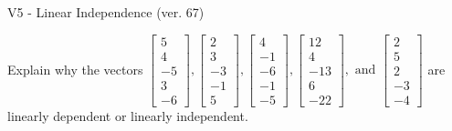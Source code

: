 \begin{exercise}
  \begin{exerciseTitle}V5 - Linear Independence (ver. 67)\end{exerciseTitle}
  \begin{exerciseStatement}
    Explain why the vectors \(\left[\begin{array}{r}
5 \\
4 \\
-5 \\
3 \\
-6
\end{array}\right] , \left[\begin{array}{r}
2 \\
3 \\
-3 \\
-1 \\
5
\end{array}\right] , \left[\begin{array}{r}
4 \\
-1 \\
-6 \\
-1 \\
-5
\end{array}\right] , \left[\begin{array}{r}
12 \\
4 \\
-13 \\
6 \\
-22
\end{array}\right] , \text{ and } \left[\begin{array}{r}
2 \\
5 \\
2 \\
-3 \\
-4
\end{array}\right]\) are linearly dependent or linearly independent.	



\end{exerciseStatement}
\end{exercise}
